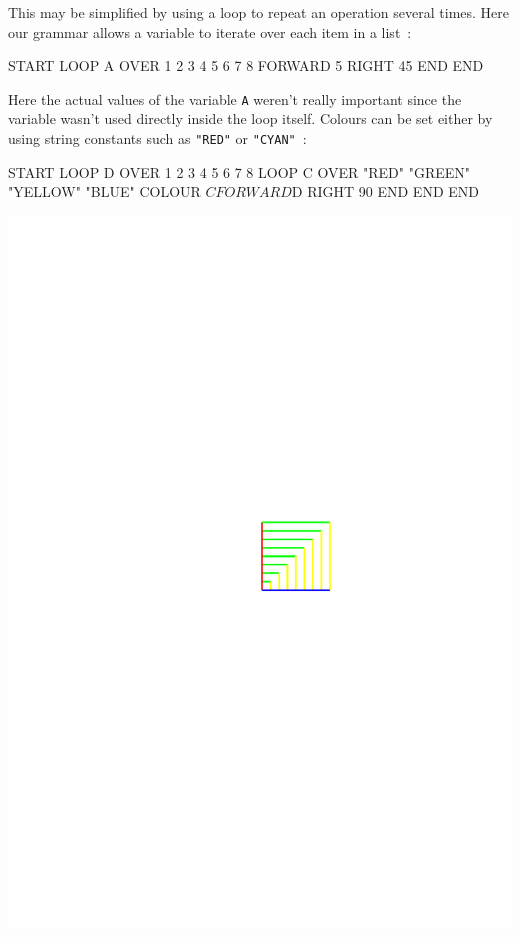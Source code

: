 \noindent This may be simplified by using a loop to repeat an operation
several times.  Here our grammar allows a variable to iterate over each
item in a list~:

\begin{codesnippet}
START
  LOOP A OVER { 1 2 3 4 5 6 7 8 }
    FORWARD 5
    RIGHT 45
  END
END
\end{codesnippet}

Here the actual values of the variable \verb^A^ weren't really important since
the variable wasn't used directly inside the loop itself.
Colours can be set either by using string constants such as \verb^"RED"^ or \verb^"CYAN"^~:

\begin{codesnippet}
START
  LOOP D OVER { 1 2 3 4 5 6 7 8 }
    LOOP C OVER { "RED" "GREEN" "YELLOW" "BLUE" }
      COLOUR $C
      FORWARD $D
      RIGHT 90
    END
  END
END
\end{codesnippet}
\begin{center}
\includegraphics[clip,trim=10cm 11cm 6cm 11cm,scale=1.25]{../Pictures/out_tunnel.pdf}
\end{center}

